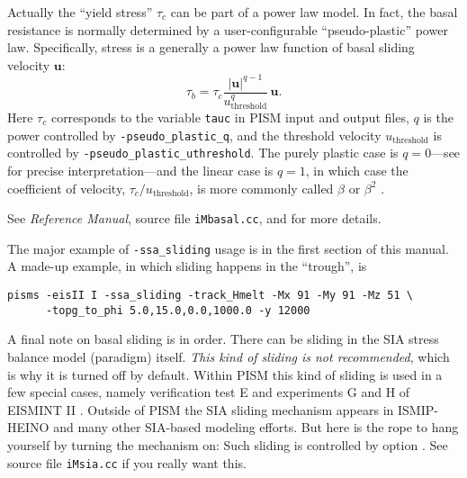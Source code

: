 Actually the ``yield stress'' $\tau_c$ can be part of a power law model.  In fact, the basal resistance is normally determined by a user-configurable ``pseudo-plastic'' power law.  Specifically, stress is a generally a power law function of basal sliding velocity $\mathbf{u}$:
   $$\tau_b = \tau_c \frac{|\mathbf{u}|^{q-1}}{u_{\text{threshold}}^q}\, \mathbf{u}.$$
Here $\tau_c$ corresponds to the variable \texttt{tauc} in PISM input and output files, $q$ is the power controlled by \texttt{-pseudo_plastic_q}, and the threshold velocity $u_{\text{threshold}}$ is controlled by \texttt{-pseudo_plastic_uthreshold}.  The purely plastic case is $q=0$---see \cite{SchoofStream} for precise interpretation---and the linear case is $q=1$, in which case the coefficient of velocity, $\tau_c/u_{\text{threshold}}$, is more commonly called $\beta$ or $\beta^2$ \cite{MacAyeal}.

See \emph{Reference Manual}, source file \texttt{iMbasal.cc}, and \cite{BBssasliding,BKAJS} for more details.

The major example of \texttt{-ssa_sliding} usage is in the first section of this manual.  A made-up example, in which sliding happens in the ``trough'', is
\begin{verbatim}
pisms -eisII I -ssa_sliding -track_Hmelt -Mx 91 -My 91 -Mz 51 \
      -topg_to_phi 5.0,15.0,0.0,1000.0 -y 12000
\end{verbatim}

A final note on basal sliding is in order.  There can be sliding in the SIA stress balance model (paradigm) itself.  \emph{This kind of sliding is not recommended}, which is why it is turned off by default.  Within PISM this kind of sliding is used in a few special cases, namely verification test E and experiments G and H of EISMINT II \cite{EISMINT00}.  Outside of PISM the SIA sliding mechanism appears in ISMIP-HEINO \cite{Calovetal2009HEINOfinal} and many other SIA-based modeling efforts.  But here is the rope to hang yourself by turning the mechanism on:  Such sliding is controlled by option .  See source file \texttt{iMsia.cc} if you really want this.

